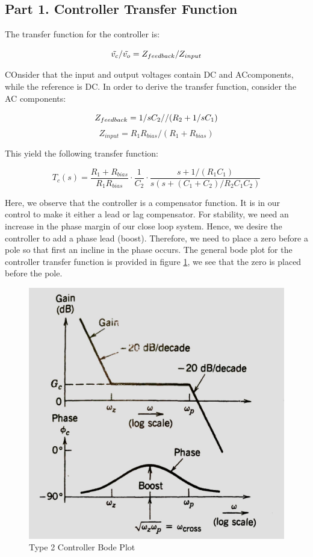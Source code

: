 \documentclass[12pt]{article}
\begin{document}
\subsection{Part 1. Controller Transfer Function}

The transfer function for the controller is:

\begin{equation*}
    \Tilde{v_{c}}/\Tilde{v_{o}}=Z_{feedback}/Z_{input}
\end{equation*}

COnsider that the input and output voltages contain DC and ACcomponents, while the reference is DC. In order to derive the transfer function, consider the AC components:


\begin{equation*}
    Z_{feedback}=1/sC_2// (R_2 +1/sC_1)\\
\end{equation*}
\begin{equation*}
Z_{input}=R_1 R_{bias}/(R_1 + R_{bias})
\end{equation*}

This yield the following transfer function:

\begin{equation*}
T_c(s)=\dfrac{R_1+R_{bias}}{R_1 R_{bias} }\cdot \dfrac{1}{C_2}\cdot \dfrac{s+1/(R_1 C_1)}{s(s+(C_1+C_2)/R_2C_1C_2)}
\end{equation*}

Here, we observe that the controller is a compensator function. It is in our control to make it either a lead or lag compensator. For stability, we need an increase in the phase margin of our close loop system. Hence, we desire the controller to add a phase lead (boost). Therefore, we need to place a zero before a pole so that first an incline in the phase occurs. The general bode plot for the controller transfer function is provided in figure \ref{fig:bode}, we see that the zero is placed before the pole. 

\begin{figure}[H]
    \centering
    \includegraphics[width=10 cm]{bode}
    \caption{Type 2 Controller Bode Plot}
    \label{fig:bode}
\end{figure}
\end{document}
